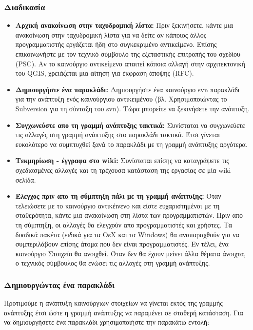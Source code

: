 \subsubsection{Διαδικασία}
\begin{itemize}
\item \textbf{Αρχική ανακοίνωση στην ταχυδρομική λίστα:}
Πριν ξεκινήσετε, κάντε μια ανακοίνωση στην ταχυδρομική λίστα για να δείτε αν κάποιος άλλος προγραμματιστής εργάζεται ήδη στο συγκεκριμένο αντικείμενο. Επίσης επικοινωνήστε με τον τεχνικό σύμβουλο της εξεταστικής επιτροπής του σχεδίου (PSC). Αν το καινούργιο αντικείμενο απαιτεί κάποια αλλαγή στην αρχιτεκτονική του QGIS, χρειάζεται μια αίτηση για έκφραση άποψης (RFC). 

\item \textbf{Δημιουργήστε ένα παρακλάδι:} 
Δημιουργήστε ένα καινούργιο svn παρακλάδι για την ανάπτυξη ενός καινούργιου αντικειμένου (βλ. Χρησιμοποιώντας το Subversion για τη σύνταξη του svn). Τώρα μπορείτε να ξεκινήσετε την ανάπτυξη.

\item \textbf{Συγχωνεύστε απο τη γραμμή ανάπτυξης τακτικά:}
Συνίσταται να συγχωνεύετε τις αλλαγές στη γραμμή ανάπτυξης στο παρακλάδι τακτικά. Έτσι γίνεται ευκολότερο να συμπτυχθεί ξανά το παρακλάδι με τη γραμμή ανάπτυξης αργότερα.

\item \textbf{Τεκμηρίωση - έγγραφα στο wiki:} 
Συνίσταται επίσης να καταγράψετε τις σχεδιασμένες αλλαγές και τη τρέχουσα κατάσταση της εργασίας σε μία wiki σελίδα.

\item \textbf{Έλεγχος πριν απο τη σύμπτηξη πάλι με τη γραμμή ανάπτυξης:} 
Όταν τελειώσετε με το καινούργιο αντικέινενο και είστε ευχαριστημένοι με τη σταθερότητα, κάντε μια ανακοίνωση στη λίστα των προγραμματιστών. Πριν απο τη σύμπτηξη, οι αλλαγές θα ελεγχούν απο προγραμματιστές και χρήστες. Τα δυαδικά πακέτα (ειδικά για τα OsX και τα Windows) θα αναπαραχθούν για να συμπεριλάβουν επίσης άτομα που δεν είναι προγραμματιστές. Εν τέλει, ένα καινούργιο Στοιχείο θα ανοιχθεί. Όταν δεν θα έχουν μείνει άλλα θέματα άνοιχτα, ο τεχνικός σύμβουλος θα ενώσει τις αλλαγές στη γραμμή ανάπτυξης.
\end{itemize}


\hypertarget{toc37}{}
\subsubsection{Δημιουργώντας ένα παρακλάδι}
Προτιμούμε η ανάπτυξη καινούργιων στοιχείων να γίνεται εκτός της γραμμής ανάπτυξης έτσι ώστε η γραμμή ανάπτυξης να παραμένει σε σταθερή κατάσταση. 
Για να δημιουργήσετε ένα παρακλάδι χρησιμοποιήστε την παρακάτω εντολή:

